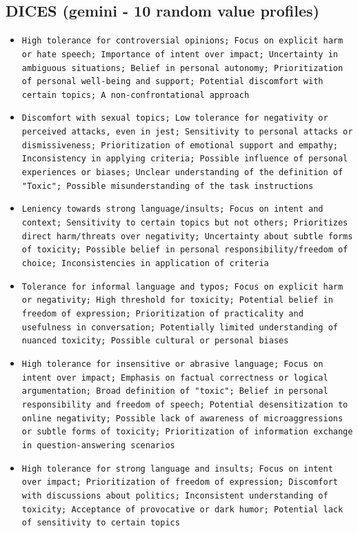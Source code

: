 \documentclass[11pt]{article}
\begin{document}
\subsection{DICES (gemini - 10 random value profiles)}
\begin{itemize}
\item \texttt{High tolerance for controversial opinions; Focus on explicit harm or hate speech; Importance of intent over impact; Uncertainty in ambiguous situations; Belief in personal autonomy; Prioritization of personal well-being and support; Potential discomfort with certain topics; A non-confrontational approach}
\item \texttt{Discomfort with sexual topics; Low tolerance for negativity or perceived attacks, even in jest; Sensitivity to personal attacks or dismissiveness; Prioritization of emotional support and empathy; Inconsistency in applying criteria; Possible influence of personal experiences or biases; Unclear understanding of the definition of "Toxic"; Possible misunderstanding of the task instructions}
\item \texttt{Leniency towards strong language/insults; Focus on intent and context; Sensitivity to certain topics but not others; Prioritizes direct harm/threats over negativity; Uncertainty about subtle forms of toxicity; Possible belief in personal responsibility/freedom of choice; Inconsistencies in application of criteria}
\item \texttt{Tolerance for informal language and typos; Focus on explicit harm or negativity; High threshold for toxicity; Potential belief in freedom of expression; Prioritization of practicality and usefulness in conversation; Potentially limited understanding of nuanced toxicity; Possible cultural or personal biases}
\item \texttt{High tolerance for insensitive or abrasive language; Focus on intent over impact; Emphasis on factual correctness or logical argumentation; Broad definition of "toxic"; Belief in personal responsibility and freedom of speech; Potential desensitization to online negativity; Possible lack of awareness of microaggressions or subtle forms of toxicity; Prioritization of information exchange in question-answering scenarios}
\item \texttt{High tolerance for strong language and insults; Focus on intent over impact; Prioritization of freedom of expression; Discomfort with discussions about politics; Inconsistent understanding of toxicity; Acceptance of provocative or dark humor; Potential lack of sensitivity to certain topics}

\end{itemize}
\end{document}
